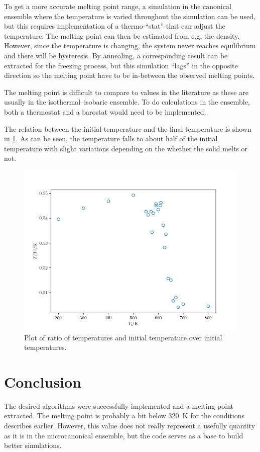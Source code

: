 \documentclass[fleqn]{scrartcl}
\begin{document}
	To get a more accurate melting point range, a simulation in the canonical ensemble where the temperature is varied throughout the simulation can be used, but this requires implementation of a thermo-``stat'' that can adjust the temperature. The melting point can then be estimated from e.g. the density. However, since the temperature is changing, the system never reaches equilibrium and there will be hysteresis. By annealing, a corresponding result can be extracted for the freezing process, but this simulation ``lags'' in the opposite direction so the melting point have to be in-between the observed melting points.
	
	The melting point is difficult to compare to values in the literature as these are usually in the isothermal–isobaric ensemble. To do calculations in the ensemble, both a thermostat and a barostat would need to be implemented.
	
	The relation between the initial temperature and the final temperature is shown in \cref{fig:temps}. As can be seen, the temperature falls to about half of the initial temperature with slight variations depending on the whether the solid melts or not.
	
	\begin{figure}[H]
		\centering
		\includegraphics[width=\textwidth]{temp_init.png}
		\caption{Plot of ratio of temperatures and initial temperature over initial temperatures.}
		\label{fig:temps}	
	\end{figure}
	
	\section{Conclusion}
	The desired algorithms were successfully implemented and a melting point extracted. The melting point is probably a bit below \SI{320}{K} for the conditions describes earlier. However, this value does not really represent a usefully quantity as it is in the microcanonical ensemble, but the code serves as a base to build better simulations.
	
	\printbibliography
	
	
\end{document}
